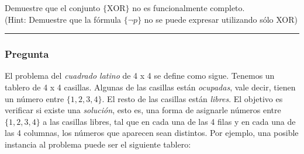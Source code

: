 \documentclass[12pt]{article}
\begin{document}
Demuestre que el conjunto $\{\text{XOR}\}$ no es funcionalmente completo.
\\ (Hint: Demuestre que la fórmula $\{\neg p \}$ no se puede expresar utilizando sólo XOR)
\\ \rule{\linewidth}{0.4pt}







\newpage


\subsubsection*{Pregunta }

El problema del \textit{cuadrado latino} de 4 x 4 se define como sigue. Tenemos un 
tablero de 4 x 4 casillas. Algunas de las casillas están \textit{ocupadas}, vale decir, tienen un
número entre $\{1, 2, 3, 4\}$. El resto de las casillas están \textit{libres}. El objetivo es verificar
si existe una \textit{solución}, esto es, una forma de asignarle números entre $\{1, 2, 3, 4\}$ a las
casillas libres, tal que en cada una de las 4 filas y en cada una de las 4 columnas, los números 
que aparecen sean distintos. Por ejemplo, una posible instancia al problema puede ser el siguiente tablero:
\end{document}
